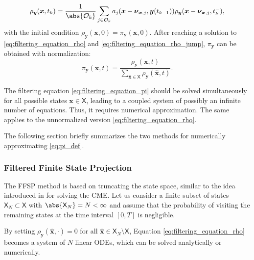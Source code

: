 \begin{equation}
\begin{aligned}
\label{eq:filtering_equation_rho_jump}
    \rho_{\boldsymbol{y}} (\boldsymbol{x}, t_k) =  \frac{1}{\abs{\mathcal{O}_k}} \sum\limits_{j \in \mathcal{O}_k} a_j (\boldsymbol{x} - \boldsymbol{\nu}_{\boldsymbol{x}, j}, \boldsymbol{y}(t_{k-1})) \rho_{\boldsymbol{y}} (\boldsymbol{x} - \boldsymbol{\nu}_{\boldsymbol{x}, j}, t_{k}^{-}),
\end{aligned}
\end{equation}
with the initial condition $\rho_{\boldsymbol{y}}(\boldsymbol{x}, 0) = \pi_{\boldsymbol{y}}(\boldsymbol{x}, 0)$.  
After reaching a solution to \eqref{eq:filtering_equation_rho} and \eqref{eq:filtering_equation_rho_jump},  $\pi_{\boldsymbol{y}}$ can be obtained with normalization:
\begin{equation}
\label{eq:rho_normalization_full}
    \pi_{\boldsymbol{y}}(\boldsymbol{x}, t) = \frac{\rho_{\boldsymbol{y}} (\boldsymbol{x}, t)}{\sum\limits_{\hat{\boldsymbol{x}} \in \mathsf{X}} \rho_{\boldsymbol{y}} (\hat{\boldsymbol{x}}, t)} .
\end{equation}

The filtering equation \eqref{eq:filtering_equation_pi} should be solved simultaneously for all possible states $\boldsymbol{x} \in \mathsf{X}$, leading to a coupled system of possibly an infinite number of equations. Thus, it requires numerical approximation. The same applies to the unnormalized version \eqref{eq:filtering_equation_rho}.

The following section briefly summarizes the two methods for numerically approximating \eqref{eq:pi_def}.



\subsubsection{Filtered Finite State Projection}
The \acf{FFSP} method \cite{DAmbrosio2022FFSP} is based on truncating the state space, similar to the idea introduced in \cite{Munsky2006FSP} for solving the \acf{CME}. Let us consider a finite subset of states $\mathsf{X}_N \subset \mathsf{X}$ with $ \abs{\mathsf{X}_N} = N < \infty$ and assume that the probability of visiting the remaining states at the time interval $[0,T]$ is negligible. 

By setting $\rho_{\boldsymbol{y}}(\hat{\boldsymbol{x}}, \cdot) = 0$ for all $\hat{\boldsymbol{x}} \in \mathsf{X}_N \setminus \mathsf{X}$, Equation \eqref{eq:filtering_equation_rho} becomes a system of $N$ linear \acp{ODE}, which can be solved analytically or numerically. 

